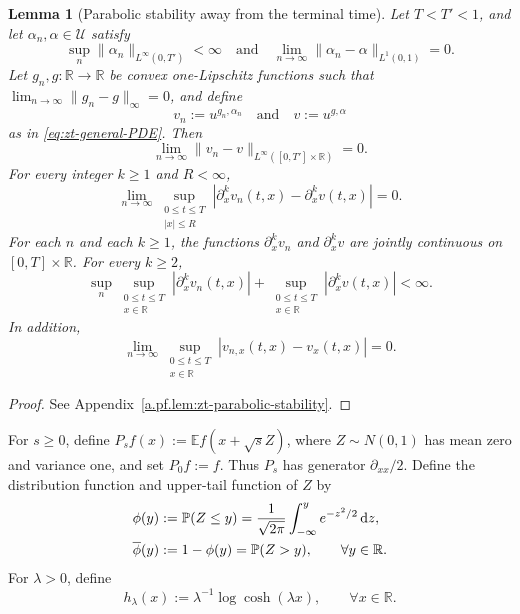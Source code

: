 \documentclass[10pt]{amsart}
\newtheorem{lemma}[lemma]{Lemma}
\theoremstyle{definition}
\theoremstyle{remark}
\numberwithin{equation}{section}
\newcommand{\R}{\mathbb R}
\newcommand{\E}{\mathbb E}
\newcommand{\PP}{\mathbb P}
\newcommand{\1}{\mathbf 1}
\newcommand{\cU}{\mathcal U}
\newcommand{\dd}{\,\mathrm d}
\begin{document}
\begin{lemma}[Parabolic stability away from the terminal time]
\label{lem:zt-parabolic-stability}
Let $T<T'<1$, and let $\alpha_n,\alpha\in\cU$ satisfy
\begin{equation*}
 \sup_n\|\alpha_n\|_{L^\infty(0,T')}<\infty
 \quad\text{and}\quad
 \lim_{n\to\infty}\|\alpha_n-\alpha\|_{L^1(0,1)}=0.
\end{equation*}
Let $g_n,g:\R\to\R$ be convex one-Lipschitz functions such that $\lim_{n\to\infty}\|g_n-g\|_\infty=0$, and define
\begin{equation*}
 v_n:=u^{g_n,\alpha_n}\quad\text{and}\quad v:=u^{g,\alpha}
\end{equation*}
as in \eqref{eq:zt-general-PDE}. Then
\begin{equation}
 \lim_{n\to\infty}\|v_n-v\|_{L^\infty([0,T']\times\R)}=0.
 \label{eq:zt-parabolic-uniform-stability}
\end{equation}
For every integer $k\geq1$ and $R<\infty$,
\begin{equation}
 \lim_{n\to\infty}
 \sup_{\substack{0\leq t\leq T\\|x|\leq R}}
 |\partial_x^kv_n(t,x)-\partial_x^kv(t,x)|=0.
 \label{eq:zt-parabolic-Ck-stability}
\end{equation}
For each $n$ and each $k\geq1$, the functions $\partial_x^kv_n$ and $\partial_x^kv$ are jointly continuous on $[0,T]\times\R$. For every $k\geq2$,
\begin{equation}
 \sup_n\sup_{\substack{0\leq t\leq T\\x\in\R}}
 |\partial_x^kv_n(t,x)|
 +\sup_{\substack{0\leq t\leq T\\x\in\R}}
 |\partial_x^kv(t,x)|<\infty.
 \label{eq:zt-global-parabolic-derivative-bound}
\end{equation}
In addition,
\begin{equation}
 \lim_{n\to\infty}
 \sup_{\substack{0\leq t\leq T\\x\in\R}}
 |v_{n,x}(t,x)-v_x(t,x)|=0.
 \label{eq:zt-global-gradient-convergence}
\end{equation}
\end{lemma}

\begin{proof}
See Appendix~\ref{a.pf.lem:zt-parabolic-stability}.
\end{proof}

For $s\geq0$, define $P_sf(x):=\E f(x+\sqrt sZ)$, where $Z\sim N(0,1)$ has mean zero and variance one, and set $P_0f:=f$. Thus $P_s$ has generator $\partial_{xx}/2$. Define the distribution function and upper-tail function of $Z$ by
\begin{align}
 \phi(y)&:=\PP(Z\leq y)=\frac1{\sqrt{2\pi}}\int_{-\infty}^ye^{-z^2/2}\dd z,\notag\\
 \overline\phi(y)&:=1-\phi(y)=\PP(Z>y),
 \qquad \forall y\in\R.
 \label{eq:standard-Gaussian-functions}
\end{align}
For $\lambda>0$, define
\begin{equation}
 h_\lambda(x):=\lambda^{-1}\log\cosh(\lambda x),
 \qquad \forall x\in\R.
 \label{eq:zt-terminal-regularization}
\end{equation}
\end{document}
